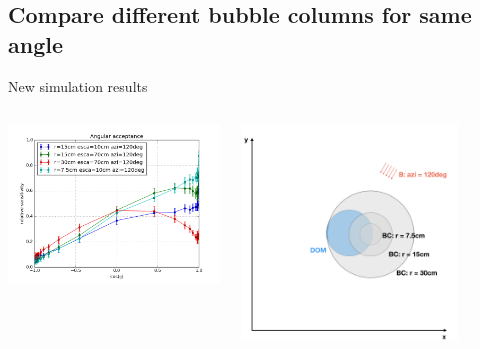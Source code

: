\subsection{Compare different bubble columns for same angle}
\begin{frame}[fragile]{New simulation results}
  \begin{columns}
    \begin{column}{0.5\textwidth}
      \includegraphics[width=\textwidth]{img/summer_scenario_azi120deg}
    \end{column}
    \begin{column}{0.5\textwidth}
      \includegraphics[width=0.8\textwidth]{img/summerscenario-006}
    \end{column}
  \end{columns}


\end{frame}
